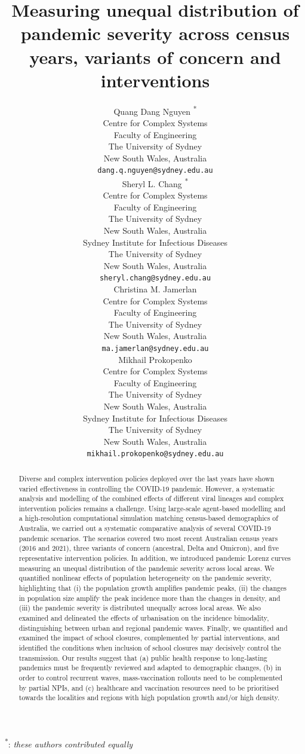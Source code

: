 \documentclass{article}
\title{Measuring unequal distribution of pandemic severity across census years, variants of concern and interventions}
\author{
   Quang Dang Nguyen \textsuperscript{*}\\
   Centre for Complex Systems\\
   Faculty of Engineering\\
   The University of Sydney\\
   New South Wales, Australia \\
   \texttt{dang.q.nguyen@sydney.edu.au} \\
    \And
   Sheryl L. Chang \textsuperscript{*} \\
   Centre for Complex Systems\\
   Faculty of Engineering\\
   The University of Sydney\\
   New South Wales, Australia \\[3pt]
   Sydney Institute for Infectious Diseases \\
   The University of Sydney\\
   New South Wales, Australia \\
   \texttt{sheryl.chang@sydney.edu.au} \\
    \And
    Christina M. Jamerlan\\
   Centre for Complex Systems\\
   Faculty of Engineering\\
   The University of Sydney\\
   New South Wales, Australia \\
   \texttt{ma.jamerlan@sydney.edu.au} \\
   \And
  Mikhail Prokopenko  \\
   Centre for Complex Systems\\
   Faculty of Engineering\\
   The University of Sydney\\
   New South Wales, Australia \\ [3pt]
   Sydney Institute for Infectious Diseases \\
   The University of Sydney\\
   New South Wales, Australia \\
 \texttt{mikhail.prokopenko@sydney.edu.au}
 }
\begin{document}
\maketitle
\vspace*{0.5cm}
\begin{abstract}
Diverse and complex intervention policies deployed over the last years have shown varied effectiveness in controlling the COVID-19 pandemic. However, a systematic analysis and modelling of the combined effects of different viral lineages and complex intervention policies remains a challenge. Using large-scale agent-based modelling and a high-resolution computational simulation matching census-based demographics of Australia, we carried out a systematic comparative analysis of several COVID-19 pandemic scenarios. The scenarios covered two most recent Australian census years (2016 and 2021), three variants of concern (ancestral, Delta and Omicron), and five representative intervention policies. In addition, we introduced pandemic Lorenz curves measuring an unequal distribution of the pandemic severity across local areas. We quantified nonlinear effects of population heterogeneity on the pandemic severity, highlighting that (i) the population growth amplifies pandemic peaks, (ii) the changes in population size amplify the peak incidence more than the changes in density, and (iii) the pandemic severity is distributed unequally across local areas. We also examined and delineated the effects of urbanisation on the incidence bimodality, distinguishing between urban and regional pandemic waves. Finally, we quantified and examined the impact of school closures, complemented by partial interventions, and identified the conditions when inclusion of school closures may decisively control the transmission. Our results suggest that (a) public health response to long-lasting pandemics must be frequently reviewed and adapted to demographic changes, (b) in order to control recurrent waves, mass-vaccination rollouts need to be complemented by partial NPIs, and (c) healthcare and vaccination resources need to be prioritised towards the localities and regions with high population growth and/or high density.
\end{abstract}


\textsuperscript{*}: \textit{these authors contributed equally}\\
\end{document}
